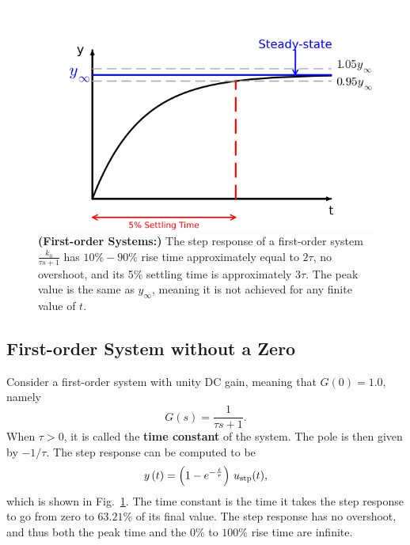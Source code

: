 
\begin{figure}[!hbt]
	\centering
		\includegraphics[width=0.7\linewidth]{graphics/Chap10/TypicalFirstorderStepResponse.png}
	\caption{\textbf{(First-order Systems:)} The step response of a first-order system $\frac{k_0}{\tau s + 1}$ has $10\% - 90\%$ rise time approximately equal to $2\tau$, no overshoot, and its 5\% settling time is approximately $3\tau$. The peak value is the same as $y_\infty$, meaning it is not achieved for any finite value of $t$.
 }
	\label{fig:TransientResponse:firstorder}
\end{figure}

\subsection{First-order System without a Zero}
Consider a first-order system with unity DC gain, meaning that $G(0)=1.0$, namely
\begin{equation}
 G\left( s \right) =\frac{1}{{\tau s + 1}}.
\end{equation}
When $\tau>0 $, it is called the \textbf{time constant} of the system. The pole is then given by $-1/\tau$. The step response can be computed to be
$$  y\left( t \right) = \left(1 - e^{ - \frac{t}{\tau } }\right)\, u_{\rm stp}(t),$$
which is shown in Fig.~\ref{fig:TransientResponse:firstorder}. The time constant is the time it takes the step response to go from zero to $63.21\%$ of its final value. The step response has no overshoot, and thus both the peak time and the $0\%$ to $100\%$ rise time are infinite.

